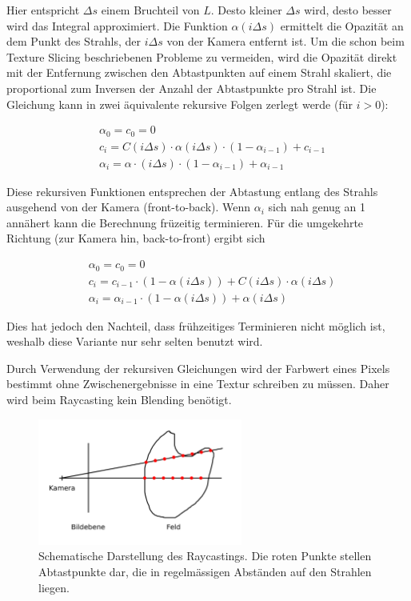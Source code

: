 \documentclass[a4paper,fontsize=12pt,toc=bib,halfparskip]{scrartcl}
\begin{document}
Hier entspricht $\Delta s$ einem Bruchteil von $L$. Desto kleiner $\Delta s$ wird, desto besser wird das Integral approximiert. Die Funktion $\alpha(i \Delta s)$ ermittelt die Opazit\"at an dem Punkt des Strahls, der $i \Delta s$ von der Kamera entfernt ist. Um die schon beim Texture Slicing beschriebenen Probleme zu vermeiden, wird die Opazit\"at direkt mit der Entfernung zwischen den Abtastpunkten auf einem Strahl skaliert, die proportional zum Inversen der Anzahl der Abtastpunkte pro Strahl ist.
Die Gleichung kann in zwei \"aquivalente rekursive Folgen zerlegt werde (f\"ur $i > 0$):

\begin{align}
&\alpha_0 = c_0 = 0\\
&c_i = C(i\Delta s)\cdot\alpha(i\Delta s)\cdot(1-\alpha_{i-1}) + c_{i-1} \label{RaycastingFormula1}\\
&\alpha_i = \alpha\cdot(i \Delta s)\cdot(1-\alpha_{i-1}) + \alpha_{i-1} \label{RaycastingFormula2}
\end{align} 

Diese rekursiven Funktionen entsprechen der Abtastung entlang des Strahls ausgehend von der Kamera (front-to-back). Wenn $\alpha_i$ sich nah genug an 1 ann\"ahert kann die Berechnung fr\"uzeitig terminieren. F\"ur die umgekehrte Richtung (zur Kamera hin, back-to-front) ergibt sich

\begin{align}
&\alpha_0 = c_0 = 0\\
&c_i = c_{i-1}\cdot(1 - \alpha(i\Delta s)) + C(i\Delta s)\cdot\alpha(i\Delta s)\\
&\alpha_i = \alpha_{i-1}\cdot(1 - \alpha(i\Delta s)) + \alpha(i \Delta s) 
\end{align}

Dies hat jedoch den Nachteil, dass fr\"uhzeitiges Terminieren nicht m\"oglich ist, weshalb diese Variante nur sehr selten benutzt wird.

Durch Verwendung der rekursiven Gleichungen wird der Farbwert eines Pixels bestimmt ohne Zwischenergebnisse in eine Textur schreiben zu m\"ussen. Daher wird beim Raycasting kein Blending ben\"otigt.


\begin{figure}
	\centering
	\includegraphics[width=0.6\textwidth]{pictures/Raycasting}
	\caption{Schematische Darstellung des Raycastings. Die roten Punkte stellen Abtastpunkte dar, die in regelm\"assigen Abst\"anden auf den Strahlen liegen.}
	\label{Raycasting}
\end{figure}
\end{document}
